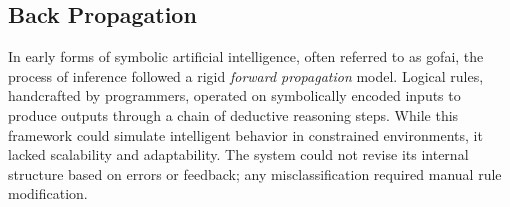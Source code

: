 %
%


\subsection{Back Propagation}
In early forms of symbolic artificial intelligence, often referred to as \gls{gofai}, the process of inference followed a rigid \textit{forward propagation} model. Logical rules, handcrafted by programmers, operated on symbolically encoded inputs to produce outputs through a chain of deductive reasoning steps. While this framework could simulate intelligent behavior in constrained environments, it lacked scalability and adaptability. The system could not revise its internal structure based on errors or feedback; any misclassification required manual rule modification.

